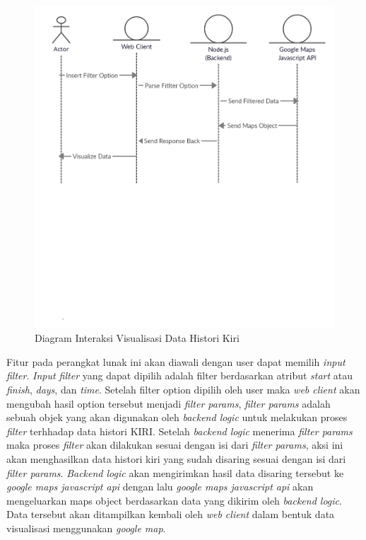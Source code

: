 \begin{figure}[H]
	\centering  
	\includegraphics[scale=0.3]{Gambar/Kiri_Sequence_Diagram.png}  
	\caption[Rancangan Diagram Interaksi]{Diagram Interaksi Visualisasi Data Histori Kiri} 
	\label{fig:interactionDiagram} 
\end{figure}

Fitur pada perangkat lunak ini akan diawali dengan user dapat memilih \textit{input filter}. \textit{Input filter} yang dapat dipilih adalah filter berdasarkan atribut \textit{start} atau \textit{finish}, \textit{days}, dan \textit{time}. Setelah filter option dipilih oleh user maka \textit{web client} akan mengubah hasil option tersebut menjadi \textit{filter params}, \textit{filter params} adalah sebuah objek yang akan digunakan oleh \textit{backend logic} untuk melakukan proses \textit{filter} terhhadap data histori KIRI. Setelah \textit{backend logic} menerima \textit{filter params} maka proses \textit{filter} akan dilakukan sesuai dengan isi dari \textit{filter params}, aksi ini akan menghasilkan data histori kiri yang sudah disaring sesuai dengan isi dari \textit{filter params}. \textit{Backend logic} akan mengirimkan hasil data disaring tersebut ke \textit{google maps javascript api} dengan lalu \textit{google maps javascript api} akan mengeluarkan maps object berdasarkan data yang dikirim oleh \textit{backend logic}. Data tersebut akan ditampilkan kembali oleh \textit{web client} dalam bentuk data visualisasi menggunakan \textit{google map}.


